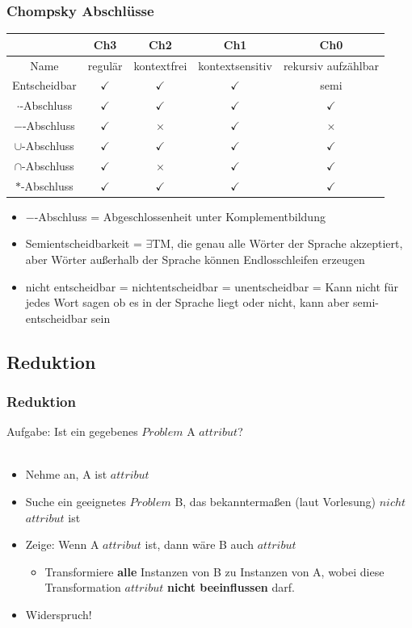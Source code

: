 \begin{frame}
	\frametitle{Chompsky Abschlüsse}
	\begin{tabular}{|*{5}{c|}}
	\hline
	&Ch3&Ch2&Ch1&Ch0\\
	\hline
	Name&regulär&kontextfrei&kontextsensitiv&rekursiv aufzählbar\\
	\hline
	Entscheidbar&$\checkmark$&$\checkmark$&$\checkmark$&semi\\
	\hline
	\glqq $\cdot$\grqq-Abschluss&$\checkmark$&$\checkmark$&$\checkmark$&$\checkmark$\\
	\hline
	\glqq $-$\grqq-Abschluss&$\checkmark$&$\times$&$\checkmark$&$\times$\\
	\hline
	\glqq $\cup$\grqq-Abschluss&$\checkmark$&$\checkmark$&$\checkmark$&$\checkmark$\\
	\hline
	\glqq $\cap$\grqq-Abschluss&$\checkmark$&$\times$&$\checkmark$&$\checkmark$\\
	\hline
	\glqq $*$\grqq-Abschluss&$\checkmark$&$\checkmark$&$\checkmark$&$\checkmark$\\
	\hline
	\end{tabular}
	\begin{itemize}
		\item \glqq $-$\grqq-Abschluss = Abgeschlossenheit unter Komplementbildung
		\item Semientscheidbarkeit = $\exists$TM, die genau alle Wörter der Sprache akzeptiert, aber Wörter außerhalb der Sprache können Endlosschleifen erzeugen
		\item nicht entscheidbar = nichtentscheidbar = unentscheidbar = Kann nicht für jedes Wort sagen ob es in der Sprache liegt oder nicht, kann aber semi-entscheidbar sein
	\end{itemize}
\end{frame}

\subsection{Reduktion}

\begin{frame}
\frametitle{Reduktion}
Aufgabe: Ist ein gegebenes $Problem$ A $attribut$?~\\~\\
\begin{itemize}
\item Nehme an, A ist $attribut$
\item Suche ein geeignetes $Problem$ B, das bekanntermaßen (laut Vorlesung) $nicht$ $attribut$ ist
\item Zeige: Wenn A $attribut$ ist, dann wäre B auch $attribut$
\begin{itemize}
	\item Transformiere \textbf{alle} Instanzen von B zu Instanzen von A, wobei diese Transformation $attribut$ \textbf{nicht beeinflussen} darf.
\end{itemize}
\item Widerspruch!
\end{itemize}
\end{frame}

